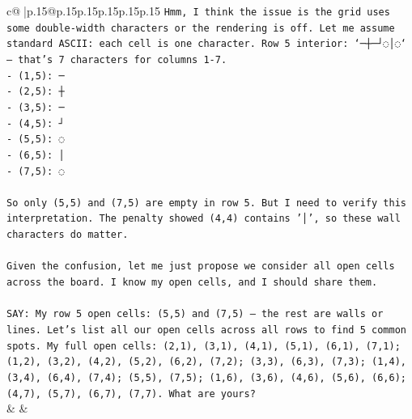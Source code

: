 \documentclass{article}
\begin{document}
{\begin{supertabular}{c@{$\;$}|p{.15\linewidth}@{}p{.15\linewidth}p{.15\linewidth}p{.15\linewidth}p{.15\linewidth}p{.15\linewidth}}
{{{\texttt{Hmm, I think the issue is the grid uses some double{-}width characters or the rendering is off. Let me assume standard ASCII: each cell is one character. Row 5 interior: `─┼─┘◌│◌` — that's 7 characters for columns 1{-}7.} \\
\texttt{{-} (1,5): ─} \\
\texttt{{-} (2,5): ┼} \\
\texttt{{-} (3,5): ─} \\
\texttt{{-} (4,5): ┘} \\
\texttt{{-} (5,5): ◌} \\
\texttt{{-} (6,5): │} \\
\texttt{{-} (7,5): ◌} \\
\\ 
\texttt{So only (5,5) and (7,5) are empty in row 5. But I need to verify this interpretation. The penalty showed (4,4) contains '│', so these wall characters do matter.} \\
\\ 
\texttt{Given the confusion, let me just propose we consider all open cells across the board. I know my open cells, and I should share them.} \\
\\ 
\texttt{SAY: My row 5 open cells: (5,5) and (7,5) — the rest are walls or lines. Let's list all our open cells across all rows to find 5 common spots. My full open cells: (2,1), (3,1), (4,1), (5,1), (6,1), (7,1); (1,2), (3,2), (4,2), (5,2), (6,2), (7,2); (3,3), (6,3), (7,3); (1,4), (3,4), (6,4), (7,4); (5,5), (7,5); (1,6), (3,6), (4,6), (5,6), (6,6); (4,7), (5,7), (6,7), (7,7). What are yours?} \\
            }
        }
    }
    & & \\ \\


\end{supertabular}}
\end{document}
